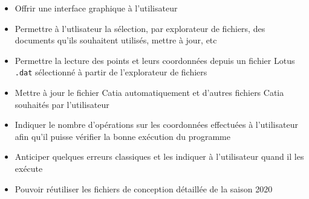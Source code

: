 \begin{itemize}
    \item Offrir une interface graphique à l'utilisateur
    \item Permettre à l'utlisateur la sélection, par explorateur de fichiers, des documents qu'ils souhaitent utilisés, mettre à jour, etc
    \item Permettre la lecture des points et leurs coordonnées depuis un fichier Lotus \texttt{.dat} sélectionné à partir de l'explorateur de fichiers
    \item Mettre à jour le fichier Catia automatiquement et d'autres fichiers Catia souhaités par l'utilisateur
    \item Indiquer le nombre d'opérations sur les coordonnées effectuées à l'utilisateur afin qu'il puisse vérifier la bonne exécution du programme
    \item Anticiper quelques erreurs classiques et les indiquer à l'utilisateur quand il les exécute
    \item Pouvoir réutiliser les fichiers de conception détaillée de la saison 2020
\end{itemize}{}